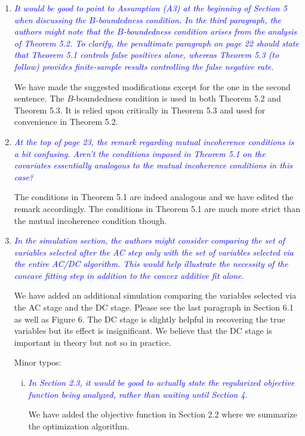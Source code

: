 \documentclass[pdftex,12pt]{article}
\def\rc#1{{\it\textcolor{blue}{#1}}\smallskip}
\begin{document}
\begin{enumerate}[(1)]
\item \rc{It would be good to point to Assumption (A3) at the beginning of
Section 5 when discussing the $B$-boundedness condition. In the third
paragraph, the authors might note that the $B$-boundedness condition
arises from the analysis of Theorem 5.2. To clarify, the penultimate
paragraph on page 22 should state that Theorem 5.1 controls false
positives alone, whereas Theorem 5.3 (to follow) provides
finite-sample results controlling the false negative rate.}

We have made the suggested modifications except for the one in the second sentence. The $B$-boundedness condition is used in both Theorem 5.2 and Theorem 5.3. It is relied upon critically in Theorem 5.3 and used for convenience in Theorem 5.2. 


\item \rc{At the top
of page 23, the remark regarding mutual incoherence conditions is a
bit confusing. Aren’t the conditions imposed in Theorem 5.1 on the
covariates essentially analogous to the mutual incoherence conditions
in this case? }

The conditions in Theorem 5.1 are indeed analogous and we have edited the remark accordingly. The conditions in Theorem 5.1 are much more strict than the mutual incoherence condition though.

\item \rc{In the simulation section, the authors might consider comparing the
set of variables selected after the AC step only with the set of
variables selected via the entire AC/DC algorithm. This would help
illustrate the necessity of the concave fitting step in addition to
the convex additive fit alone.}

We have added an additional simulation comparing the variables selected via the AC stage and the DC stage. Please see the last paragraph in Section 6.1 as well as Figure 6. The DC stage is slightly helpful in recovering the true variables but its effect is insignificant. We believe that the DC stage is important in theory but not so in practice. 

Minor typos:
\begin{enumerate}[(i)]
\item \rc{In Section 2.3, it would be good to actually state the regularized
objective function being analyzed, rather than waiting until Section
4.}

We have added the objective function in Section 2.2 where we summarize the optimization algorithm.


\end{enumerate}
\end{enumerate}
\end{document}
